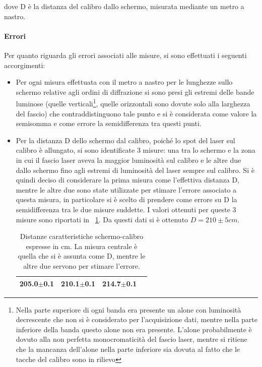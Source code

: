 \documentclass[a4paper,10pt]{article}
\begin{document}
{{dove D è la distanza del calibro dallo schermo, misurata mediante un metro a nastro.
\paragraph{Errori}
Per quanto riguarda gli errori associati alle misure, si sono effettuati i seguenti accorgimenti:
\begin{itemize}
\item Per ogni misura effettuata con il metro a nastro per le lunghezze sullo schermo relative agli ordini di diffrazione si sono presi gli estremi delle bande luminose (quelle verticali\footnote{Nella parte superiore di ogni banda era presente un alone con luminosità decrescente che non si è considerato per l'acquisizione dati, mentre nella parte inferiore della banda questo alone non era presente. L'alone probabilmente è dovuto alla non perfetta monocromaticità del fascio laser, mentre si ritiene che la mancanza dell'alone nella parte inferiore sia dovuta al fatto che le tacche del calibro sono in rilievo},
quelle orizzontali sono dovute solo alla larghezza del fascio) che contraddistinguono tale punto e si è considerata come valore la semisomma e come errore la semidifferenza tra questi punti.
\item Per la distanza D dello schermo dal calibro, poiché lo spot del laser sul calibro è allungato, si sono identificate 3 misure: una tra lo schermo e la zona in cui il fascio laser aveva la maggior luminosità sul calibro e le altre due dallo schermo fino agli estremi di luminosità del laser sempre sul calibro. Si è quindi deciso di considerare la prima misura come l'effettiva distanza D, mentre le altre due sono state utilizzate per stimare l'errore associato a questa misura, in particolare si è scelto di prendere come errore su D la semidifferenza tra le due misure suddette. I valori ottenuti per queste 3 misure sono riportati in \tablename{~\ref{tab:D}}. Da questi dati si è ottenuto $D = 210 \pm 5 cm$.

\begin{table}[H]
	\centering
	\begin{tabular}{c|c|c|c}
\hline
205.0$\pm$0.1 & 210.1$\pm$0.1 & 214.7$\pm$0.1\\
\hline
	\end{tabular}
\caption{Distanze caratteristiche schermo-calibro espresse in cm. La misura centrale è quella che si è assunta come D, mentre le altre due servono per stimare l'errore.}
\label{tab:D}
\end{table}


\end{itemize}}}
\end{document}
